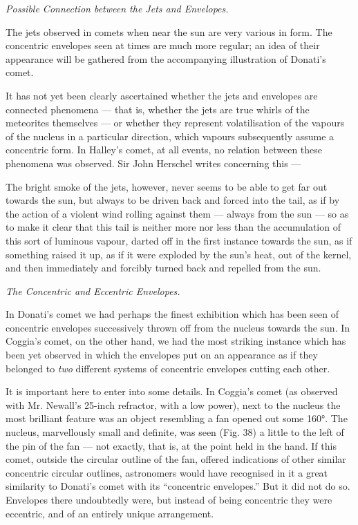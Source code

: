 \documentclass[a4paper, 12pt, oneside, polutonikogreek, english]{article}
\begin{document}
\emph{Possible Connection between the Jets and Envelopes.}

The jets observed in comets when near the sun are very various in form. The concentric envelopes seen at times are much more regular; an idea of their appearance will be gathered from the accompanying illustration of Donati's comet.

It has not yet been clearly ascertained whether the jets and envelopes are connected phenomena --- that is, whether the jets are true whirls of the meteorites themselves --- or whether they represent volatilisation of the vapours of the nucleus in a particular direction, which vapours subsequently assume a concentric form. In Halley's comet, at all events, no relation between these phenomena was observed. Sir John Herschel writes concerning this ---

The bright smoke of the jets, however, never seems to be able to get far out towards the sun, but always to be driven back and forced into the tail, as if by the action of a violent wind rolling against them --- always from the sun --- so as to make it clear that this tail is neither more nor less than the accumulation of this sort of luminous vapour, darted off in the first instance towards the sun, as if something raised it up, as if it were exploded by the sun's heat, out of the kernel, and then immediately and forcibly turned back and repelled from the sun.

\emph{The Concentric and Eccentric Envelopes.}

In Donati's comet we had perhaps the finest exhibition which has been seen of concentric envelopes successively thrown off from the nucleus towards the sun. In Coggia's comet, on the other hand, we had the most striking instance which has been yet observed in which the envelopes put on an appearance as if they belonged to \emph{two} different systems of concentric envelopes cutting each other.

It is important here to enter into some details. In Coggia's comet (as observed with Mr. Newall's 25-inch refractor, with a low power), next to the nucleus the most brilliant feature was an object resembling a fan opened out some 160°. The nucleus, marvellously small and definite, was seen (Fig. 38) a little to the left of the pin of the fan --- not exactly, that is, at the point held in the hand. If this comet, outside the circular outline of the fan, offered indications of other similar concentric circular outlines, astronomers would have recognised in it a great similarity to Donati's comet with its ``concentric envelopes.'' But it did not do so. Envelopes there undoubtedly were, but instead of being concentric they were eccentric, and of an entirely unique arrangement.
\end{document}
